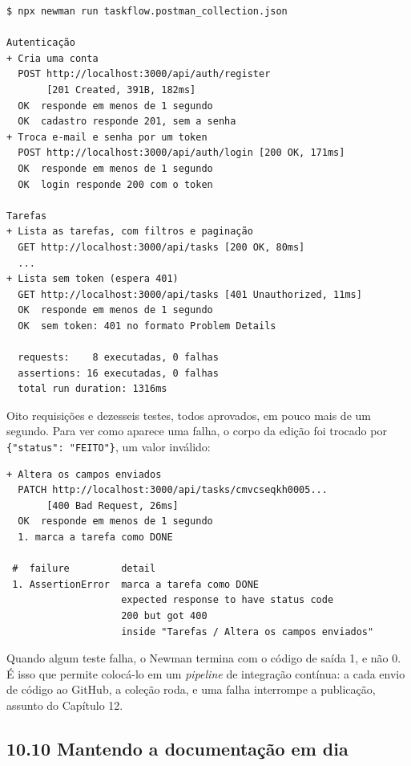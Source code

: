 \begin{codigo}
\begin{Verbatim}[breaklines=true, breaksymbolleft={}, fontsize=\footnotesize]
$ npx newman run taskflow.postman_collection.json

Autenticação
+ Cria uma conta
  POST http://localhost:3000/api/auth/register
       [201 Created, 391B, 182ms]
  OK  responde em menos de 1 segundo
  OK  cadastro responde 201, sem a senha
+ Troca e-mail e senha por um token
  POST http://localhost:3000/api/auth/login [200 OK, 171ms]
  OK  responde em menos de 1 segundo
  OK  login responde 200 com o token

Tarefas
+ Lista as tarefas, com filtros e paginação
  GET http://localhost:3000/api/tasks [200 OK, 80ms]
  ...
+ Lista sem token (espera 401)
  GET http://localhost:3000/api/tasks [401 Unauthorized, 11ms]
  OK  responde em menos de 1 segundo
  OK  sem token: 401 no formato Problem Details

  requests:    8 executadas, 0 falhas
  assertions: 16 executadas, 0 falhas
  total run duration: 1316ms
\end{Verbatim}
\end{codigo}

Oito requisições e dezesseis testes, todos aprovados, em pouco mais de um segundo. Para ver como aparece uma falha, o corpo da edição foi trocado por \texttt{\{"status": "FEITO"\}}, um valor inválido:

\begin{codigo}
\begin{Verbatim}[breaklines=true, breaksymbolleft={}, fontsize=\footnotesize]
+ Altera os campos enviados
  PATCH http://localhost:3000/api/tasks/cmvcseqkh0005...
       [400 Bad Request, 26ms]
  OK  responde em menos de 1 segundo
  1. marca a tarefa como DONE

 #  failure         detail
 1. AssertionError  marca a tarefa como DONE
                    expected response to have status code
                    200 but got 400
                    inside "Tarefas / Altera os campos enviados"
\end{Verbatim}
\end{codigo}

Quando algum teste falha, o Newman termina com o código de saída 1, e não 0. É isso que permite colocá-lo em um \textit{pipeline} de integração contínua: a cada envio de código ao GitHub, a coleção roda, e uma falha interrompe a publicação, assunto do Capítulo 12.

\subsection{10.10 Mantendo a documentação em dia}

